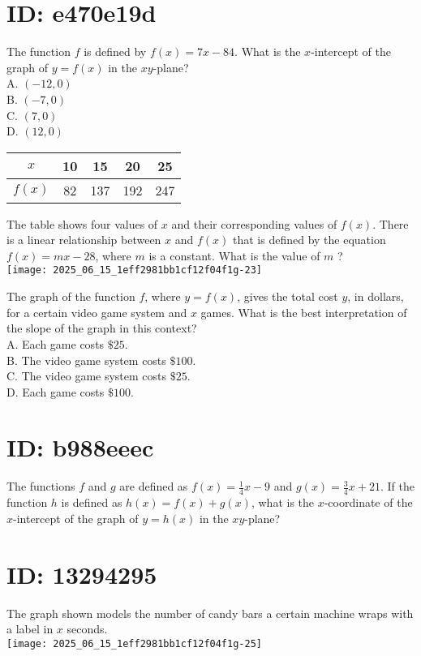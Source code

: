 \section*{ID: e470e19d}
The function $f$ is defined by $f(x)=7 x-84$. What is the $x$-intercept of the graph of $y=f(x)$ in the $x y$-plane?\\
A. $(-12,0)$\\
B. $(-7,0)$\\
C. $(7,0)$\\
D. $(12,0)$

\begin{center}
\begin{tabular}{|c|c|c|c|c|}
\hline
$x$ & 10 & 15 & 20 & 25 \\
\hline
$f(x)$ & 82 & 137 & 192 & 247 \\
\hline
\end{tabular}
\end{center}

The table shows four values of $x$ and their corresponding values of $f(x)$. There is a linear relationship between $x$ and $f(x)$ that is defined by the equation $f(x)=m x-28$, where $m$ is a constant. What is the value of $m$ ?\\
\texttt{[image: 2025\_06\_15\_1eff2981bb1cf12f04f1g-23]}

The graph of the function $f$, where $y=f(x)$, gives the total cost $y$, in dollars, for a certain video game system and $x$ games. What is the best interpretation of the slope of the graph in this context?\\
A. Each game costs $\$ 25$.\\
B. The video game system costs $\$ 100$.\\
C. The video game system costs $\$ 25$.\\
D. Each game costs $\$ 100$.

\section*{ID: b988eeec}
The functions $f$ and $g$ are defined as $f(x)=\frac{1}{4} x-9$ and $g(x)=\frac{3}{4} x+21$. If the function $h$ is defined as $h(x)=f(x)+g(x)$, what is the $x$-coordinate of the $x$-intercept of the graph of $y=h(x)$ in the $x y$-plane?

\section*{ID: 13294295}
The graph shown models the number of candy bars a certain machine wraps with a label in $x$ seconds.\\
\texttt{[image: 2025\_06\_15\_1eff2981bb1cf12f04f1g-25]}

